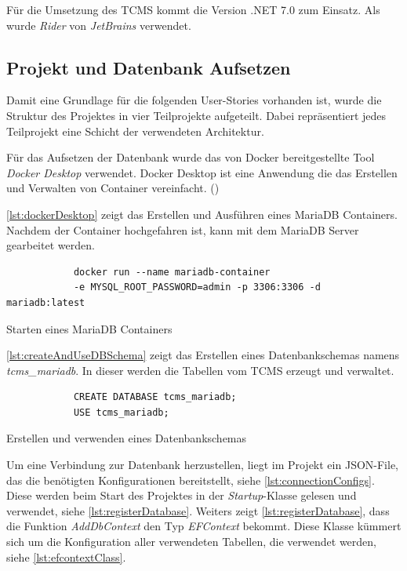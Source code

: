 \documentclass[a4paper, fontsize=11pt, parskip=half, twoside]{scrreprt}
\begin{document}
	Für die Umsetzung des \ac{TCMS} kommt die Version .NET 7.0 zum Einsatz.
	Als  wurde \emph{Rider} von \emph{JetBrains} verwendet.


	\subsection{Projekt und Datenbank Aufsetzen}
	Damit eine Grundlage für die folgenden User-Stories vorhanden ist, wurde die Struktur des Projektes in vier Teilprojekte aufgeteilt.
	Dabei repräsentiert jedes Teilprojekt eine Schicht der verwendeten Architektur.
	
	Für das Aufsetzen der Datenbank wurde das von Docker bereitgestellte Tool \emph{Docker Desktop} verwendet.
	Docker Desktop ist eine Anwendung die das Erstellen und Verwalten von Container vereinfacht. (\textcite{noauthor_docker_2022})
	
	\autoref{lst:dockerDesktop} zeigt das Erstellen und Ausführen eines MariaDB Containers.
	Nachdem der Container hochgefahren ist, kann mit dem MariaDB Server gearbeitet werden.
	
	\begin{listing}[ht]
		\begin{verbatim}
			docker run --name mariadb-container 
			-e MYSQL_ROOT_PASSWORD=admin -p 3306:3306 -d mariadb:latest
		\end{verbatim}
		\caption{Starten eines MariaDB Containers}
		\label{lst:dockerDesktop}
	\end{listing}

	\autoref{lst:createAndUseDBSchema} zeigt das Erstellen eines Datenbankschemas namens \emph{tcms\_mariadb}. 
	In dieser werden die Tabellen vom \ac{TCMS} erzeugt und verwaltet.
	
	\begin{listing}[ht]
		\begin{verbatim}
			CREATE DATABASE tcms_mariadb; 
			USE tcms_mariadb;
		\end{verbatim}
		\caption{Erstellen und verwenden eines Datenbankschemas}
		\label{lst:createAndUseDBSchema}
	\end{listing}

	Um eine Verbindung zur Datenbank herzustellen, liegt im Projekt ein \ac{JSON}-File, das die benötigten Konfigurationen bereitstellt, siehe \autoref{lst:connectionConfigs}.
	Diese werden beim Start des Projektes in der \emph{Startup}-Klasse gelesen und verwendet, siehe \autoref{lst:registerDatabase}.
	Weiters zeigt \autoref{lst:registerDatabase}, dass die Funktion \emph{AddDbContext} den Typ \emph{EFContext} bekommt. 
	Diese Klasse kümmert sich um die Konfiguration aller verwendeten Tabellen, die verwendet werden, siehe \autoref{lst:efcontextClass}.
\end{document}
